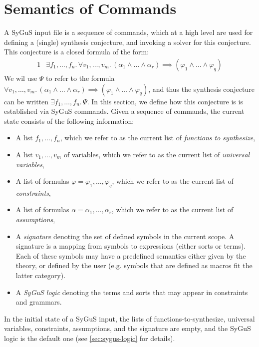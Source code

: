 \documentclass[english,a4paper,10pt]{article}
\begin{document}

\section{Semantics of Commands}
\label{sec:semantics}

A SyGuS input file is a sequence of commands,
which at a high level
are used for defining a (single) synthesis conjecture,
and invoking a solver for this conjecture.
This conjecture is a closed formula of the form:
\begin{alignat*}{1}
 & \exists f_1,\ldots,f_n.\, \forall v_1,\ldots,v_m.\,(\alpha_1 \wedge \ldots \wedge \alpha_r) \implies (\varphi_1 \wedge \ldots \wedge \varphi_q )
\end{alignat*}
We wil use $\Psi$ to refer to the formula $\forall v_1,\ldots,v_m.\,(\alpha_1 \wedge \ldots \wedge \alpha_r)\implies (\varphi_1 \wedge \ldots \wedge \varphi_q )$, and thus the synthesis conjecture can be written $\exists f_1,\ldots,f_n.\, \Psi$. 
In this section, we define how this conjecture is
is established via SyGuS commands.
Given a sequence of commands, the current state consists of the following
information:
\begin{itemize}
\item A list
$f_1, \ldots, f_n$, which we refer to
as the current list of \emph{functions to synthesize},
\item A list 
$v_1, \ldots, v_m$ of variables, 
which we refer to as the current list of \emph{universal variables},
\item A list of formulas
$\varphi = \varphi_1, \ldots, \varphi_q$,
which we refer to as the current list of \emph{constraints},
\item A list of formulas
$\alpha = \alpha_1, \ldots, \alpha_r$,
which we refer to as the current list of \emph{assumptions},
\item A \emph{signature}
denoting the set of defined symbols in the current scope.
A signature is 
a mapping from symbols to expressions (either sorts or terms).
Each of these symbols may have a predefined semantics
either given by the theory,
or defined by the user (e.g. symbols that are defined as macros
fit the latter category).
\item A \emph{SyGuS logic} denoting the
terms and sorts that may appear in constraints and grammars.
\end{itemize}
In the initial state of a SyGuS input,
the lists of functions-to-synthesize, 
universal variables, constraints, assumptions, and the signature are empty,
and the SyGuS logic is the default one 
(see \cref{sec:sygus-logic} for details).  
\end{document}
